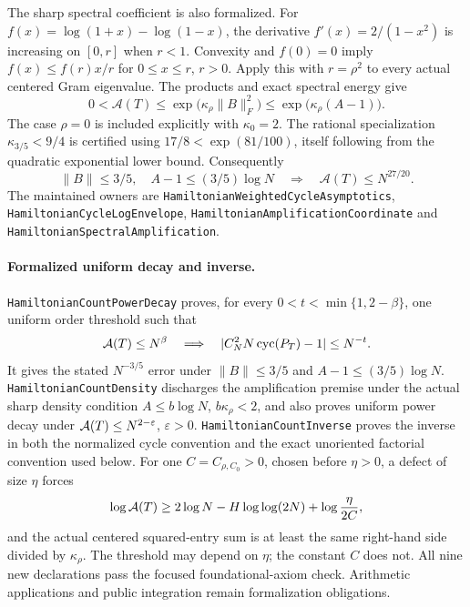 The sharp spectral coefficient is also formalized.
For \(f(x)=\log(1+x)-\log(1-x)\),
the derivative \(f'(x)=2/(1-x^2)\) is increasing on \([0,r]\) when
\(r<1\).  Convexity and \(f(0)=0\) imply
\(f(x)\leq f(r)x/r\) for \(0\leq x\leq r\), \(r>0\).
Apply this with \(r=\rho^2\) to every actual centered Gram eigenvalue.
The products and exact spectral energy give
\[
 0<\mathcal A(T)\leq
   \exp\!\bigl(\kappa_\rho\|B\|_F^2\bigr)
   \leq\exp\!\bigl(\kappa_\rho(A-1)\bigr).
\]
The case \(\rho=0\) is included explicitly with \(\kappa_0=2\).
The rational specialization
\(\kappa_{3/5}<9/4\) is certified using
\(17/8<\exp(81/100)\), itself following from the quadratic
exponential lower bound.  Consequently
\[
 \|B\|\leq3/5,\quad A-1\leq(3/5)\log N
       \quad\Longrightarrow\quad \mathcal A(T)\leq N^{27/20}.
\]
The maintained owners are
\texttt{HamiltonianWeightedCycleAsymptotics},
\texttt{HamiltonianCycleLogEnvelope},
\texttt{HamiltonianAmplificationCoordinate} and
\texttt{HamiltonianSpectralAmplification}.
\paragraph{Formalized uniform decay and inverse.}
\texttt{HamiltonianCountPowerDecay} proves, for every
\(0<t<\min\{1,2-\beta\}\), one uniform order threshold such that
\[
 {\cal A}(T)\leq N^\beta
 \quad\Longrightarrow\quad
 |C_N^2N\operatorname{cyc}(P_T)-1|\leq N^{-t}.
\]
It gives the stated \(N^{-3/5}\) error under
\(\|B\|\leq3/5\) and \(A-1\leq(3/5)\log N\).
\texttt{HamiltonianCountDensity} discharges the amplification premise
under the actual sharp density condition \(A\leq b\log N\),
\(b\kappa_\rho<2\), and also proves uniform power decay under
\({\cal A}(T)\leq N^{2-\varepsilon}\), \(\varepsilon>0\).
\texttt{HamiltonianCountInverse} proves the inverse in both the
normalized cycle convention and the exact unoriented factorial
convention used below. For one \(C=C_{\rho,C_0}>0\), chosen before
\(\eta>0\), a defect of size \(\eta\) forces
\[
 \log{\cal A}(T)\geq
 2\log N-H\log\log(2N)+\log\frac{\eta}{2C},
\]
and the actual centered squared-entry sum is at least the same
right-hand side divided by \(\kappa_\rho\).
The threshold may depend on \(\eta\); the constant \(C\) does not.
All nine new declarations pass the focused foundational-axiom check.
Arithmetic applications and public integration remain formalization
obligations.

